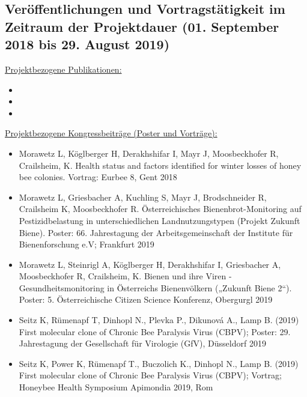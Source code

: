 \subsection*{Veröffentlichungen und Vortragstätigkeit im Zeitraum der Projektdauer (01. September 2018 bis 29. August 2019)}
\label{cha:publications}

\underline{Projektbezogene Publikationen:}


\begin{itemize}
   
    \item 
    \item
    \item

\end{itemize}

\underline{Projektbezogene Kongressbeiträge (Poster und Vorträge):}

\begin{itemize}

    \item 
    Morawetz L, Köglberger H, Derakhshifar I, Mayr J, Moosbeckhofer R, Crailsheim, K. Health status and factors identified for winter losses of honey bee colonies. Vortrag: Eurbee 8, Gent 2018
    
    \item 
    Morawetz L, Griesbacher A, Kuchling S, Mayr J, Brodschneider R, Crailsheim K, Moosbeckhofer R. Österreichisches Bienenbrot-Monitoring auf Pestizidbelastung in unterschiedlichen Landnutzungstypen (Projekt Zukunft Biene). Poster: 66. Jahrestagung der Arbeitsgemeinschaft der Institute für Bienenforschung e.V; Frankfurt 2019

    \item 
    Morawetz L, Steinrigl A, Köglberger H, Derakhshifar I, Griesbacher A, Moosbeckhofer R, Crailsheim, K. Bienen und ihre Viren - Gesundheitsmonitoring in Österreichs Bienenvölkern („Zukunft Biene 2“). Poster: 5. Österreichische Citizen Science Konferenz, Obergurgl 2019

    \item 
    Seitz K, Rümenapf T, Dinhopl N., Plevka P., Dikunová A., Lamp B. (2019) First molecular clone of Chronic Bee Paralysis Virus (CBPV); Poster: 29. Jahrestagung der Gesellschaft für Virologie (GfV), Düsseldorf 2019

    \item 
    Seitz K, Power K, Rümenapf T., Buczolich K., Dinhopl N., Lamp B. (2019) First molecular clone of Chronic Bee Paralysis Virus (CBPV); Vortrag; Honeybee Health Symposium Apimondia 2019, Rom

\end{itemize}


